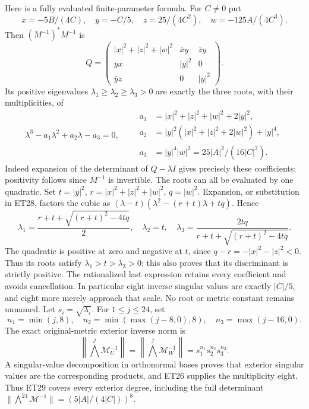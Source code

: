 \documentclass[11pt]{article}
\begin{document}
Here is a fully evaluated finite-parameter formula. For $C\ne0$ put
\[
 x=-5B/(4C),\quad y=-C/5,\quad z=25/(4C^2),\quad w=-125A/(4C^3).
\]
Then $(M^{-1})^*M^{-1}$ is
\[
 Q=\begin{pmatrix}
 |x|^2+|z|^2+|w|^2&\bar x y&\bar z y\\
 \bar y x&|y|^2&0\\
 \bar y z&0&|y|^2
 \end{pmatrix}.
 \tag{ET27}
\]
Its positive eigenvalues $\lambda_1\ge\lambda_2\ge\lambda_3>0$
are exactly the three roots, with their multiplicities, of
\[
 \lambda^3-a_1\lambda^2+a_2\lambda-a_3=0,\qquad
 \begin{aligned}
 a_1&=|x|^2+|z|^2+|w|^2+2|y|^2,\\
 a_2&=|y|^2(|x|^2+|z|^2+2|w|^2)+|y|^4,\\
 a_3&=|y|^4|w|^2=25|A|^2/(16|C|^2).
 \end{aligned}
 \tag{ET28}
\]
Indeed expansion of the determinant of $Q-\lambda I$ gives precisely
these coefficients; positivity follows since $M^{-1}$ is invertible.
The roots can all be evaluated by one quadratic. Set
$t=|y|^2$, $r=|x|^2+|z|^2+|w|^2$, $q=|w|^2$.
Expansion, or substitution in ET28, factors the cubic as
$(\lambda-t)(\lambda^2-(r+t)\lambda+tq)$. Hence
\[
 \lambda_1=\frac{r+t+\sqrt{(r+t)^2-4tq}}2,\quad
 \lambda_2=t,\quad
 \lambda_3=\frac{2tq}{r+t+\sqrt{(r+t)^2-4tq}} .
 \tag{ET28a}
\]
The quadratic is positive at zero and negative at $t$, since
$q-r=-|x|^2-|z|^2<0$. Thus its roots satisfy
$\lambda_1>t>\lambda_3>0$; this also proves that its discriminant
is strictly positive. The rationalized last expression retains every
coefficient and avoids cancellation. In particular eight inverse
singular values are exactly $|C|/5$, and eight more merely approach
that scale. No root or metric constant remains unnamed.
Let $s_i=\sqrt{\lambda_i}$. For $1\le j\le24$, set
\[
 n_1=\min(j,8),\quad n_2=\min(\max(j-8,0),8),\quad
 n_3=\max(j-16,0).
\]
The exact original-metric exterior inverse norm is
\[
 \left\|\bigwedge^j\mathcal M_U^{-1}\right\|
 =\left\|\bigwedge^j\mathcal M_W^{-1}\right\|
 =s_1^{n_1}s_2^{n_2}s_3^{n_3}.
 \tag{ET29}
\]
A singular-value decomposition in orthonormal bases proves that
exterior singular values are the corresponding products, and ET26
supplies the multiplicity eight. Thus ET29 covers every exterior degree,
including the full determinant
$\|\bigwedge^{24}\mathcal M^{-1}\|=(5|A|/(4|C|))^8$.
\end{document}
